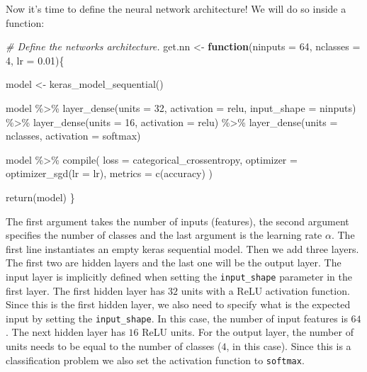 \documentclass[
  11pt,
]{krantz}
\newenvironment{Shaded}{\begin{snugshade}}{\end{snugshade}}
\newcommand{\AttributeTok}[1]{\textcolor[rgb]{0.61,0.61,0.61}{#1}}
\newcommand{\CommentTok}[1]{\textcolor[rgb]{0.37,0.37,0.37}{\textit{#1}}}
\newcommand{\ControlFlowTok}[1]{\textcolor[rgb]{0.27,0.27,0.27}{\textbf{#1}}}
\newcommand{\DecValTok}[1]{\textcolor[rgb]{0.06,0.06,0.06}{#1}}
\newcommand{\FloatTok}[1]{\textcolor[rgb]{0.06,0.06,0.06}{#1}}
\newcommand{\FunctionTok}[1]{\textcolor[rgb]{0,0,0}{#1}}
\newcommand{\NormalTok}[1]{#1}
\newcommand{\OtherTok}[1]{\textcolor[rgb]{0.37,0.37,0.37}{#1}}
\newcommand{\SpecialCharTok}[1]{\textcolor[rgb]{0,0,0}{#1}}
\newcommand{\StringTok}[1]{\textcolor[rgb]{0.5,0.5,0.5}{#1}}
\begin{document}
Now it's time to define the neural network architecture! We will do so inside a function:

\begin{Shaded}
\begin{Highlighting}[]
\CommentTok{\# Define the network\textquotesingle{}s architecture.}
\NormalTok{get.nn }\OtherTok{\textless{}{-}} \ControlFlowTok{function}\NormalTok{(}\AttributeTok{ninputs =} \DecValTok{64}\NormalTok{, }\AttributeTok{nclasses =} \DecValTok{4}\NormalTok{, }\AttributeTok{lr =} \FloatTok{0.01}\NormalTok{)\{}
  
\NormalTok{  model }\OtherTok{\textless{}{-}} \FunctionTok{keras\_model\_sequential}\NormalTok{()}
  
\NormalTok{  model }\SpecialCharTok{\%\textgreater{}\%}
    \FunctionTok{layer\_dense}\NormalTok{(}\AttributeTok{units =} \DecValTok{32}\NormalTok{, }\AttributeTok{activation =} \StringTok{\textquotesingle{}relu\textquotesingle{}}\NormalTok{,}
                \AttributeTok{input\_shape =}\NormalTok{ ninputs) }\SpecialCharTok{\%\textgreater{}\%} 
    \FunctionTok{layer\_dense}\NormalTok{(}\AttributeTok{units =} \DecValTok{16}\NormalTok{, }\AttributeTok{activation =} \StringTok{\textquotesingle{}relu\textquotesingle{}}\NormalTok{) }\SpecialCharTok{\%\textgreater{}\%}
    \FunctionTok{layer\_dense}\NormalTok{(}\AttributeTok{units =}\NormalTok{ nclasses, }\AttributeTok{activation =} \StringTok{\textquotesingle{}softmax\textquotesingle{}}\NormalTok{)}
  
\NormalTok{  model }\SpecialCharTok{\%\textgreater{}\%} \FunctionTok{compile}\NormalTok{(}
    \AttributeTok{loss =} \StringTok{\textquotesingle{}categorical\_crossentropy\textquotesingle{}}\NormalTok{,}
    \AttributeTok{optimizer =} \FunctionTok{optimizer\_sgd}\NormalTok{(}\AttributeTok{lr =}\NormalTok{ lr),}
    \AttributeTok{metrics =} \FunctionTok{c}\NormalTok{(}\StringTok{\textquotesingle{}accuracy\textquotesingle{}}\NormalTok{)}
\NormalTok{  )}
  
  \FunctionTok{return}\NormalTok{(model)}
\NormalTok{\}}
\end{Highlighting}
\end{Shaded}

The first argument takes the number of inputs (features), the second argument specifies the number of classes and the last argument is the learning rate \(\alpha\). The first line instantiates an empty keras sequential model. Then we add three layers. The first two are hidden layers and the last one will be the output layer. The input layer is implicitly defined when setting the \texttt{input\_shape} parameter in the first layer. The first hidden layer has \(32\) units with a ReLU activation function. Since this is the first hidden layer, we also need to specify what is the expected input by setting the \texttt{input\_shape}. In this case, the number of input features is \(64\). The next hidden layer has \(16\) ReLU units. For the output layer, the number of units needs to be equal to the number of classes (\(4\), in this case). Since this is a classification problem we also set the activation function to \texttt{softmax}.
\end{document}
